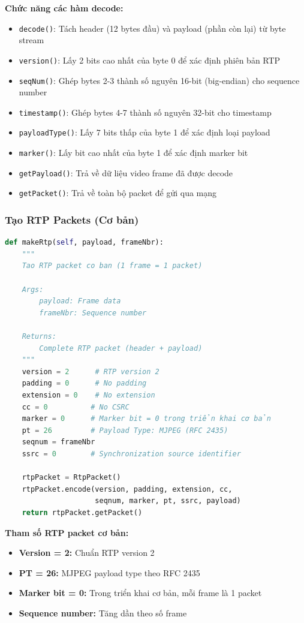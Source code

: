 \documentclass[a4paper,12pt]{article}
\begin{document}
\textbf{Chức năng các hàm decode:}
\begin{itemize}
    \item \texttt{decode()}: Tách header (12 bytes đầu) và payload (phần còn lại) từ byte stream
    \item \texttt{version()}: Lấy 2 bits cao nhất của byte 0 để xác định phiên bản RTP
    \item \texttt{seqNum()}: Ghép bytes 2-3 thành số nguyên 16-bit (big-endian) cho sequence number
    \item \texttt{timestamp()}: Ghép bytes 4-7 thành số nguyên 32-bit cho timestamp
    \item \texttt{payloadType()}: Lấy 7 bits thấp của byte 1 để xác định loại payload
    \item \texttt{marker()}: Lấy bit cao nhất của byte 1 để xác định marker bit
    \item \texttt{getPayload()}: Trả về dữ liệu video frame đã được decode
    \item \texttt{getPacket()}: Trả về toàn bộ packet để gửi qua mạng
\end{itemize}

\subsubsection{Tạo RTP Packets (Cơ bản)}

\begin{lstlisting}[language=Python, caption={Make RTP Packet - Basic Version}]
def makeRtp(self, payload, frameNbr):
    """
    Tao RTP packet co ban (1 frame = 1 packet)
    
    Args:
        payload: Frame data
        frameNbr: Sequence number
    
    Returns:
        Complete RTP packet (header + payload)
    """
    version = 2      # RTP version 2
    padding = 0      # No padding
    extension = 0    # No extension
    cc = 0          # No CSRC
    marker = 0      # Marker bit = 0 trong triển khai cơ bản
    pt = 26         # Payload Type: MJPEG (RFC 2435)
    seqnum = frameNbr
    ssrc = 0        # Synchronization source identifier
    
    rtpPacket = RtpPacket()
    rtpPacket.encode(version, padding, extension, cc, 
                     seqnum, marker, pt, ssrc, payload)
    return rtpPacket.getPacket()
\end{lstlisting}

\textbf{Tham số RTP packet cơ bản:}
\begin{itemize}
    \item \textbf{Version = 2:} Chuẩn RTP version 2
    \item \textbf{PT = 26:} MJPEG payload type theo RFC 2435
    \item \textbf{Marker bit = 0:} Trong triển khai cơ bản, mỗi frame là 1 packet
    \item \textbf{Sequence number:} Tăng dần theo số frame
\end{itemize}
\end{document}
